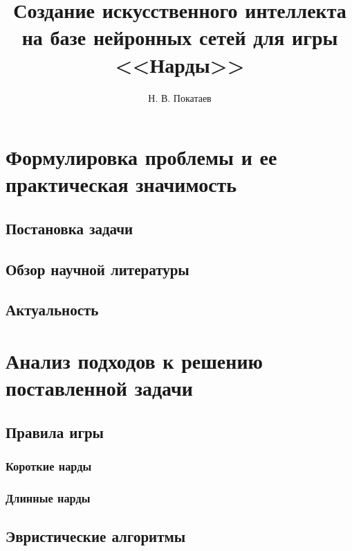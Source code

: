 \documentclass{vsureport}
\title{Создание искусственного интеллекта на базе нейронных сетей для игры <<Нарды>>}
\author{Н. В. Покатаев}
\begin{document}
\maketitle

\tableofcontents



\section{Формулировка проблемы и ее практическая значимость}


\subsection{Постановка задачи}


\subsection{Обзор научной литературы}


\subsection{Актуальность}


\section{Анализ подходов к решению поставленной задачи}


\subsection{Правила игры}


\subsubsection{Короткие нарды}


\subsubsection{Длинные нарды}


\subsection{Эвристические алгоритмы}

\end{document}
